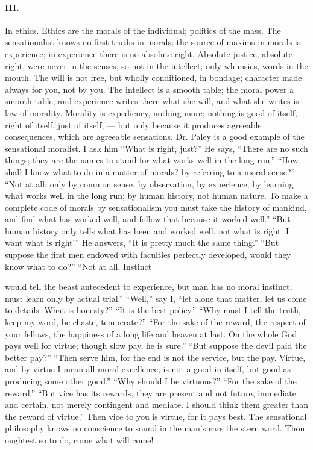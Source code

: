 \documentclass[12pt]{article}
\begin{document}
\paragraph{III.} In ethics. Ethics are the morals of the individual; politics of the mass. The sensationalist knows 
no first truths in morals; the source of maxims in morals is experience; in experience there is no absolute 
right. Absolute justice, absolute right, were never in 
the senses, so not in the intellect; only whimsies, words 
in the mouth. The will is not free, but wholly conditioned, in bondage; character made always for you, 
not by you. The intellect is a smooth table; the moral 
power a smooth table; and experience writes there what 
she will, and what she writes is law of morality. Morality is expediency, nothing more; nothing is good of 
itself, right of itself, just of itself, --- but only because 
it produces agreeable consequences, which are agreeable 
sensations. Dr. Paley is a good example of the sensational moralist. I ask him ``What is right, just?'' 
He says, ``There are no such things; they are the 
names to stand for what works well in the long run.'' 
``How shall I know what to do in a matter of morals? 
by referring to a moral sense?'' ``Not at all: only 
by common sense, by observation, by experience, by 
learning what works well in the long run; by human 
history, not human nature. To make a complete code 
of morals by sensationalism you must take the history 
of mankind, and find what has worked well, and follow 
that because it worked well.'' ``But human history 
only tells what has been and worked well, not what is 
right. I want what is right!'' He answers, ``It is 
pretty much the same thing.'' ``But suppose the first 
men endowed with faculties perfectly developed, would 
they know what to do?'' ``Not at all. Instinct 




would tell the beast antecedent to experience, but man 
has no moral instinct, must learn only by actual trial.'' 
``Well,'' say I, ``let alone that matter, let us come to 
details. What is honesty?'' ``It is the best policy.'' 
``Why must I tell the truth, keep my word, be chaste, 
temperate?'' ``For the sake of the reward, the respect 
of your fellows, the happiness of a long life and heaven 
at last. On the whole God pays well for virtue; though 
slow pay, he is sure.'' ``But suppose the devil paid the 
better pay?'' ``Then serve him, for the end is not the 
service, but the pay. Virtue, and by virtue I mean all 
moral excellence, is not a good in itself, but good as 
producing some other good.'' ``Why should I be virtuous?'' ``For the sake of the reward.'' ``But vice 
has its rewards, they are present and not future, immediate and certain, not merely contingent and mediate. I should think them greater than the reward of 
virtue.'' Then vice to you is virtue, for it pays best. 
The sensational philosophy knows no conscience to 
sound in the man's ears the stern word. Thou oughtest 
so to do, come what will come!
\end{document}
